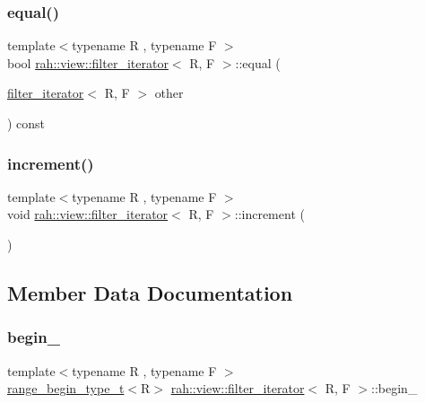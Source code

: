 \subsubsection{\texorpdfstring{equal()}{equal()}}
{\footnotesize\ttfamily template$<$typename R , typename F $>$ \\
bool \mbox{\hyperlink{structrah_1_1view_1_1filter__iterator}{rah\+::view\+::filter\+\_\+iterator}}$<$ R, F $>$\+::equal (\begin{DoxyParamCaption}\item[{\mbox{\hyperlink{structrah_1_1view_1_1filter__iterator}{filter\+\_\+iterator}}$<$ R, F $>$}]{other }\end{DoxyParamCaption}) const\hspace{0.3cm}{\ttfamily [inline]}}

\mbox{\label{structrah_1_1view_1_1filter__iterator_a63278a452be5e546e6fb3aa0b1a90bfb}} 
\subsubsection{\texorpdfstring{increment()}{increment()}}
{\footnotesize\ttfamily template$<$typename R , typename F $>$ \\
void \mbox{\hyperlink{structrah_1_1view_1_1filter__iterator}{rah\+::view\+::filter\+\_\+iterator}}$<$ R, F $>$\+::increment (\begin{DoxyParamCaption}{ }\end{DoxyParamCaption})\hspace{0.3cm}{\ttfamily [inline]}}



\subsection{Member Data Documentation}
\mbox{\label{structrah_1_1view_1_1filter__iterator_af25f988051c25994b9a6211838555a3d}} 
\subsubsection{\texorpdfstring{begin\_}{begin\_}}
{\footnotesize\ttfamily template$<$typename R , typename F $>$ \\
\mbox{\hyperlink{namespacerah_afa7f59d1f37c7b9d9caed37551be9eaa}{range\+\_\+begin\+\_\+type\+\_\+t}}$<$R$>$ \mbox{\hyperlink{structrah_1_1view_1_1filter__iterator}{rah\+::view\+::filter\+\_\+iterator}}$<$ R, F $>$\+::begin\+\_\+}


